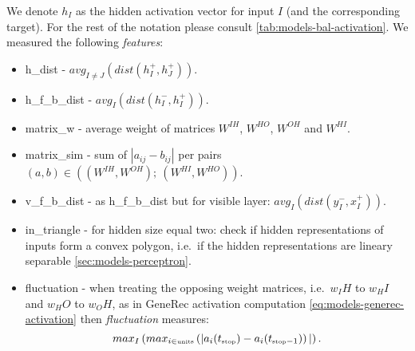 We denote $h_I$ as the hidden activation vector for input $I$ (and the corresponding target). For the rest of the notation please consult \ref{tab:models-bal-activation}. We measured the following \emph{features}: 
\begin{itemize} 
\item h\_dist - $avg_{I \neq J}\left(dist(h_I^{+},h_J^{+})\right)$.
\item h\_f\_b\_dist - $avg_{I}\left(dist(h_I^{-},h_I^{+})\right)$.
\item matrix\_w - average weight of matrices $W^{IH}$, $W^{HO}$, $W^{OH}$ and $W^{HI}$. 
\item matrix\_sim - sum of $|a_{ij} - b_{ij}|$ per pairs $(a,b) \in ((W^{IH}, W^{OH});\ (W^{HI}, W^{HO}))$. 
\item	v\_f\_b\_dist - as h\_f\_b\_dist but for visible layer: $avg_{I}\left(dist(y_I^{-},x_I^{+})\right)$. 
\item in\_triangle - for hidden size equal two: check if hidden representations of inputs form a convex polygon, i.e.~if the hidden representations are lineary separable \ref{sec:models-perceptron}. 
\item fluctuation - when treating the opposing weight matrices, i.e.~$w_IH$ to $w_HI$ and $w_HO$ to $w_OH$, as in GeneRec activation computation \ref{eq:models-generec-activation} then \emph{fluctuation} measures:
\begin{equation}
  \label{eq:our-fluctuation}
  max_{I}\left(
    max_{i \in \mbox{\tiny units}}\left(
      |a_i(t_{\mbox{\tiny stop}}) - a_i(t_{\mbox{\tiny stop}-1})
    \right)|
  \right). 
\end{equation}



\end{itemize} 


